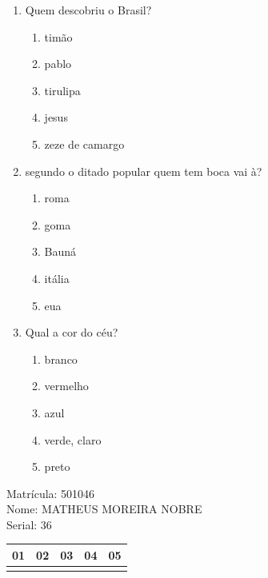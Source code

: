 \documentclass[10pt,a4paper,twocolumn]{report}
\begin{document}
 \begin{enumerate} 
    \item  Quem descobriu o Brasil?





    \begin{enumerate}
    \item  timão

\item  pablo

\item  tirulipa

\item  jesus

\item  zeze de camargo


    \end{enumerate} 
    \item  segundo o ditado popular quem tem boca vai à?





    \begin{enumerate}
    \item  roma

\item  goma

\item  Bauná

\item  itália

\item  eua


    \end{enumerate} 
    \item  Qual a cor do céu?





    \begin{enumerate}
    \item  branco

\item  vermelho

\item  azul

\item  verde, claro

\item  preto


    \end{enumerate}\end{enumerate} 
Matrícula: 501046\\ Nome: MATHEUS MOREIRA NOBRE \\ Serial: 36\\
\begin{tabular}{|l|l|l|l|l|}\hline
01  &02  &03  &04  &05 \\ \hline 
 & & & & \\ \hline 
\end{tabular}
 \cleardoublepage 
\end{document}
